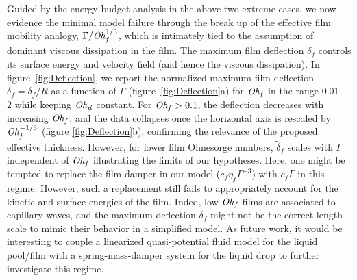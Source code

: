 Guided by the energy budget analysis in the above two extreme cases, we now evidence the minimal model failure through the break up of the effective film mobility analogy, $\Gamma/\mathit{Oh}_\mathit{f}^{1/3}$, which is intimately tied to the assumption of dominant viscous dissipation in the film. The maximum film deflection $\delta_f$ controls its surface energy and velocity field (and hence the viscous dissipation). 
In figure~\ref{fig:Deflection}, we report the normalized maximum film deflection $\tilde{\delta}_f = \delta_f/R$ as a function of $\Gamma$ (figure~\ref{fig:Deflection}a) for $\mathit{Oh}_\mathit{f}$ in the range $0.01$ -- $2$ while keeping $\mathit{Oh}_\mathit{d}$ constant.
For $\mathit{Oh}_\mathit{f} > 0.1$, the deflection decreases with increasing $\mathit{Oh}_\mathit{f}$, and the data collapses once the horizontal axis is rescaled by $\mathit{Oh}_\mathit{f}^{-1/3}$ (figure \ref{fig:Deflection}b), confirming the relevance of the proposed effective thickness.
However, for lower film Ohnesorge numbers, $\tilde{\delta}_f$ scales with $\Gamma$ independent of $\mathit{Oh}_\mathit{f}$ illustrating the limits of our hypotheses.
Here, one might be tempted to replace the film damper in our model ($c_f\eta_f\Gamma^{-3}$) with $c_f\Gamma$ in this regime. However, such a replacement still fails to appropriately account for the kinetic and surface energies of the film. Inded, low $\mathit{Oh}_\mathit{f}$ films are associated to capillary waves, and the maximum deflection $\delta_f$ might not be the correct length scale to mimic their behavior in a simplified model. 
As future work, it would be interesting to couple a linearized quasi-potential fluid model \citep{galeano2017non, galeano2021capillary} for the liquid pool/film with a spring-mass-damper system for the liquid drop to further investigate this regime. 

